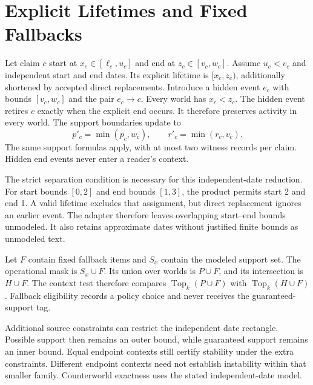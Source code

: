 \section{Explicit Lifetimes and Fixed Fallbacks}
\label{app:lifecycle}
Let claim $c$ start at $x_c\in[\ell_c,u_c]$ and end at $z_c\in[v_c,w_c]$.
Assume $u_c<v_c$ and independent start and end dates.
Its explicit lifetime is $[x_c,z_c)$, additionally shortened by accepted direct replacements.
Introduce a hidden event $e_c$ with bounds $[v_c,w_c]$ and the pair $e_c\to c$.
Every world has $x_c<z_c$.
The hidden event retires $c$ exactly when the explicit end occurs.
It therefore preserves activity in every world.
The support boundaries update to
\[
 p'_c=\min(p_c,w_c),\qquad r'_c=\min(r_c,v_c).
\]
The same support formulas apply, with at most two witness records per claim.
Hidden end events never enter a reader's context.

The strict separation condition is necessary for this independent-date reduction.
For start bounds $[0,2]$ and end bounds $[1,3]$, the product permits start 2 and end 1.
A valid lifetime excludes that assignment, but direct replacement ignores an earlier event.
The adapter therefore leaves overlapping start--end bounds unmodeled.
It also retains approximate dates without justified finite bounds as unmodeled text.

Let $F$ contain fixed fallback items and $S_x$ contain the modeled support set.
The operational mask is $S_x\cup F$.
Its union over worlds is $P\cup F$, and its intersection is $H\cup F$.
The context test therefore compares $\operatorname{Top}_k(P\cup F)$ with $\operatorname{Top}_k(H\cup F)$.
Fallback eligibility records a policy choice and never receives the guaranteed-support tag.

Additional source constraints can restrict the independent date rectangle.
Possible support then remains an outer bound, while guaranteed support remains an inner bound.
Equal endpoint contexts still certify stability under the extra constraints.
Different endpoint contexts need not establish instability within that smaller family.
Counterworld exactness uses the stated independent-date model.
